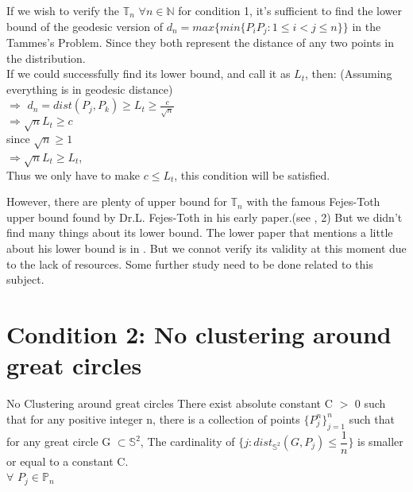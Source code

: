 \documentclass[12pt]{article}
\numberwithin{equation}{section}
\let\bb\mathbb
\newenvironment{general}[2][]{\begin{box_for_gene}[#1]{#2}}{\end{box_for_gene}}
\let\bb\mathbb
\begin{document}
		If we wish to verify the $\bb{T}_n \,\, \forall n\in \bb{N}$ for condition 1, it's sufficient to find the lower bound of the geodesic version of $d_n = max\{min\{P_iP_j: 1\leq i<j\leq n\}\}$ in the Tammes's Problem. Since they both represent the distance of any two points in the distribution.\\
		
		If we could successfully find its lower bound, and call it as $L_t$, then: (Assuming everything is in geodesic distance)\\
		$\Rightarrow$ $d_n = dist(P_j, P_k) \geq L_t \geq \frac{c}{\sqrt{n}}$\\
		$\Rightarrow \sqrt{n}L_t \geq c$
		 \\
		 since $\sqrt{n} \geq 1$ \\
		 $\Rightarrow \sqrt{n}L_t \geq L_t$,\\
		 Thus we only have to make $c \leq L_t$, this condition will be satisfied.
		
		However, there are plenty of upper bound for $\bb{T}_n$ with the famous Fejes-Toth upper bound found by Dr.L. Fejes-Toth in his early paper.(see \cite{mooers_1994_tammess}, 2) But we didn't find many things about its lower bound. The lower paper that mentions a little about his lower bound is in \cite{eb_1997_distributing}. But we connot verify its validity at this moment due to the lack of resources. Some further study need to be done related to this subject.
	\vspace{10mm}

	
	\newpage
	\section{Condition 2: No clustering around great circles}
	\begin{general}[c2]{No Clustering around great circles}
	There exist absolute constant C $>$ 0 such that for any positive integer n, there is a collection of points $\{ P_j^n \}_{j=1}^n$ such that 
		for any great circle G $ \subset  \bb{S}^2$,
		The cardinality of $ \{ j:dist_{{\bb{S}}^2} (G, P_j)\leq \dfrac{1}{n} \}$ is smaller or equal to a constant C. \\
		$\forall$ $P_j \in \bb{P}_n$
	\end{general}
\end{document}
